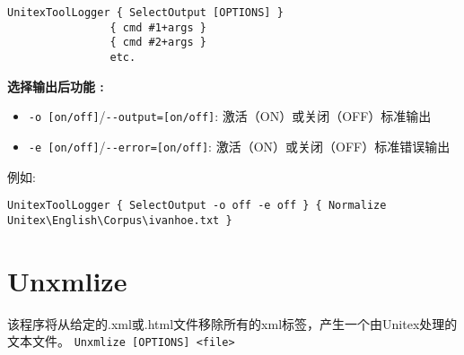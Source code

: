  
\bigskip
\begin{verbatim}
UnitexToolLogger { SelectOutput [OPTIONS] } 
                { cmd #1+args } 
                { cmd #2+args }
                etc.
\end{verbatim}

\bigskip
\noindent \textbf{选择输出后功能 :}
\begin{itemize}
\item \verb+-o [on/off]+/\verb+--output=[on/off]+: 激活（ON）或关闭（OFF）标准输出
\item \verb+-e [on/off]+/\verb+--error=[on/off]+: 激活（ON）或关闭（OFF）标准错误输出
\end{itemize} 

\noindent 例如:
\begin{verbatim}
UnitexToolLogger { SelectOutput -o off -e off } { Normalize 
Unitex\English\Corpus\ivanhoe.txt }
\end{verbatim}


\section{Unxmlize}
\label{section-Unxmlize}

该程序将从给定的.xml或.html文件移除所有的xml标签，产生一个由Unitex处理的文本文件。
\bigskip
\noindent
\verb+Unxmlize [OPTIONS] <file>+           

